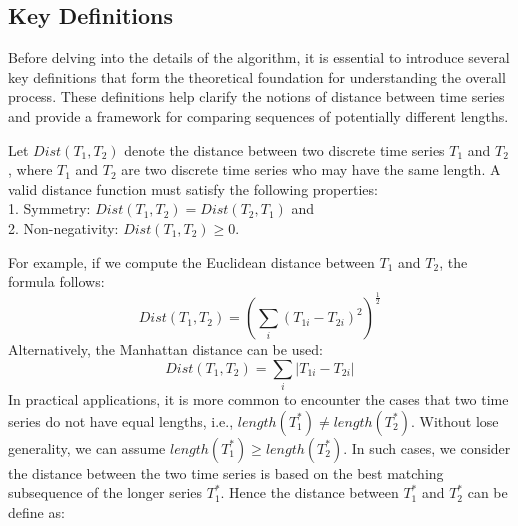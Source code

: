 \subsection{Key Definitions}
Before delving into the details of the algorithm, it is essential to introduce several key definitions that form the theoretical foundation for understanding the overall process. These definitions help clarify the notions of distance between time series and provide a framework for comparing sequences of potentially different lengths.
\begin{definition}%
Let $Dist(T_1,T_2)$ denote the distance between two discrete time series $T_1$ and $T_2$, where $T_1$ and $T_2$ are two discrete time series who may have the same length. A valid distance function must satisfy the following properties:\\
1. Symmetry: $Dist(T_1,T_2)=Dist(T_2,T_1)$ and \\
2. Non-negativity: $Dist(T_1,T_2) \geq 0$. 
\end{definition}%
\noindent For example, if we compute the Euclidean distance between $T_1$ and $T_2$, the formula follows:
$$
Dist(T_1,T_2)=(\sum_i(T_{1i}-T_{2i})^2)^{\frac{1}{2}}
$$
Alternatively, the Manhattan distance can be used:\\
$$
Dist(T_1,T_2)=\sum_i|T_{1i}-T_{2i}|
$$
In practical applications, it is more common to encounter the cases that two time series do not have equal lengths, i.e., $length(T_1^*) \neq length(T_2^*)$. Without lose generality, we can assume $length(T_1^*)\geq length(T_2^*)$. In such cases, we consider the distance between the two time series is based on the best matching subsequence of the longer series $T_1^*$. Hence the distance between $T_1^*$ and $T_2^*$ can be define as:

